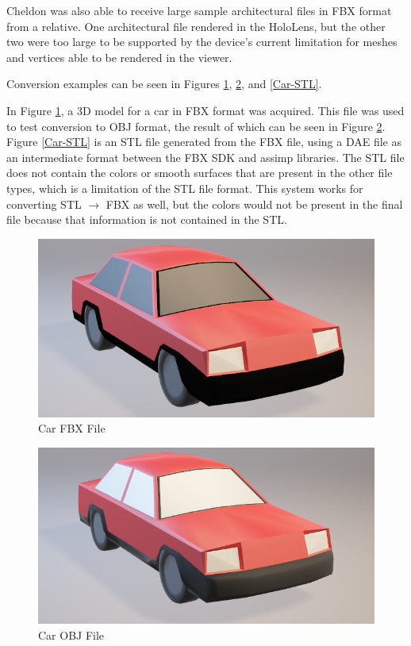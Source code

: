     Cheldon was also able to receive large sample architectural files in FBX format from a relative. One architectural file rendered in the HoloLens, but the other two were too large to be supported by the device's current limitation for meshes and vertices able to be rendered in the viewer.

    Conversion examples can be seen in Figures \ref{Car-FBX}, \ref{Car-OBJ}, and \ref{Car-STL}.  
    
    In Figure \ref{Car-FBX}, a 3D model for a car in FBX format was acquired. This file was used to test conversion to OBJ format, the result of which can be seen in Figure \ref{Car-OBJ}. Figure \ref{Car-STL} is an STL file generated from the FBX file, using a DAE file as an intermediate format between the FBX SDK and assimp libraries. The STL file does not contain the colors or smooth surfaces that are present in the other file types, which is a limitation of the STL file format. This system works for converting STL $\rightarrow$ FBX as well, but the colors would not be present in the final file because that information is not contained in the STL. 
    
\begin{figure}[H]
    \centering
    \includegraphics[width=\textwidth]{Car-FBX.png}
    \caption{Car FBX File}
    \label{Car-FBX}
\end{figure}

\begin{figure}[H]
    \centering
    \includegraphics[width=\textwidth]{Car-OBJ.png}
    \caption{Car OBJ File}
    \label{Car-OBJ}
\end{figure}

